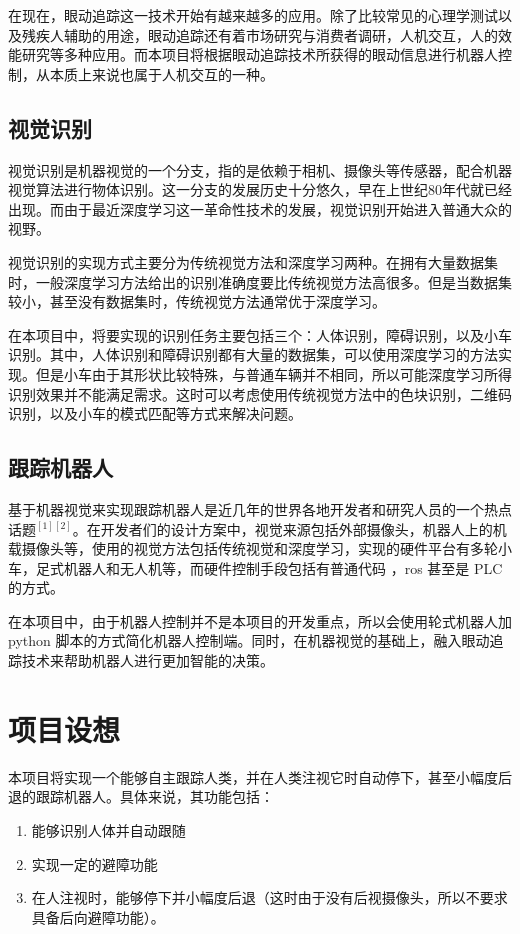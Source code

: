 \documentclass{article}
\begin{document}
\begin{spacing}{1.5}
​在现在，眼动追踪这一技术开始有越来越多的应用。除了比较常见的心理学测试以及残疾人辅助的用途，眼动追踪还有着市场研究与消费者调研，人机交互，人的效能研究等多种应用。而本项目将根据眼动追踪技术所获得的眼动信息进行机器人控制，从本质上来说也属于人机交互的一种。


    \subsection{视觉识别}

视觉识别是机器视觉的一个分支，指的是依赖于相机、摄像头等传感器，配合机器视觉算法进行物体识别。这一分支的发展历史十分悠久，早在上世纪80年代就已经出现。而由于最近深度学习这一革命性技术的发展，视觉识别开始进入普通大众的视野。

视觉识别的实现方式主要分为传统视觉方法和深度学习两种。在拥有大量数据集时，一般深度学习方法给出的识别准确度要比传统视觉方法高很多。但是当数据集较小，甚至没有数据集时，传统视觉方法通常优于深度学习。
    
在本项目中，将要实现的识别任务主要包括三个：人体识别，障碍识别，以及小车识别。其中，人体识别和障碍识别都有大量的数据集，可以使用深度学习的方法实现。但是小车由于其形状比较特殊，与普通车辆并不相同，所以可能深度学习所得识别效果并不能满足需求。这时可以考虑使用传统视觉方法中的色块识别，二维码识别，以及小车的模式匹配等方式来解决问题。
    
    \subsection{跟踪机器人}

基于机器视觉来实现跟踪机器人是近几年的世界各地开发者和研究人员的一个热点话题$^{[1][2]}$。在开发者们的设计方案中，视觉来源包括外部摄像头，机器人上的机载摄像头等，使用的视觉方法包括传统视觉和深度学习，实现的硬件平台有多轮小车，足式机器人和无人机等，而硬件控制手段包括有普通代码 ，ros 甚至是 PLC 的方式。

​在本项目中，由于机器人控制并不是本项目的开发重点，所以会使用轮式机器人加 python 脚本的方式简化机器人控制端。同时，在机器视觉的基础上，融入眼动追踪技术来帮助机器人进行更加智能的决策。
\section{项目设想}

​	本项目将实现一个能够自主跟踪人类，并在人类注视它时自动停下，甚至小幅度后退的跟踪机器人。具体来说，其功能包括：

    \begin{enumerate}
        \item 能够识别人体并自动跟随
        \item 实现一定的避障功能
        \item 在人注视时，能够停下并小幅度后退（这时由于没有后视摄像头，所以不要求具备后向避障功能）。
    \end{enumerate}


\end{spacing}
\end{document}

